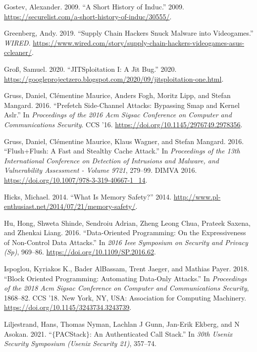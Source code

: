 \documentclass[a4paper,]{report}
\begin{document}
\leavevmode\hypertarget{ref-Gostev2009}{}%
Gostev, Alexander. 2009. ``A Short History of Induc.'' 2009.
\url{https://securelist.com/a-short-history-of-induc/30555/}.

\leavevmode\hypertarget{ref-Greenberg2019}{}%
Greenberg, Andy. 2019. ``Supply Chain Hackers Snuck Malware into
Videogames.'' \emph{WIRED}.
\url{https://www.wired.com/story/supply-chain-hackers-videogames-asus-ccleaner/}.

\leavevmode\hypertarget{ref-Grouxdf2020}{}%
Groß, Samuel. 2020. ``JITSploitation I: A Jit Bug.'' 2020.
\url{https://googleprojectzero.blogspot.com/2020/09/jitsploitation-one.html}.

\leavevmode\hypertarget{ref-Gruss2016}{}%
Gruss, Daniel, Clémentine Maurice, Anders Fogh, Moritz Lipp, and Stefan
Mangard. 2016. ``Prefetch Side-Channel Attacks: Bypassing Smap and
Kernel Aslr.'' In \emph{Proceedings of the 2016 Acm Sigsac Conference on
Computer and Communications Security}. CCS '16.
\url{https://doi.org/10.1145/2976749.2978356}.

\leavevmode\hypertarget{ref-Gruss2016a}{}%
Gruss, Daniel, Clémentine Maurice, Klaus Wagner, and Stefan Mangard.
2016. ``Flush+Flush: A Fast and Stealthy Cache Attack.'' In
\emph{Proceedings of the 13th International Conference on Detection of
Intrusions and Malware, and Vulnerability Assessment - Volume 9721},
279--99. DIMVA 2016. \url{https://doi.org/10.1007/978-3-319-40667-1_14}.

\leavevmode\hypertarget{ref-Hicks2014}{}%
Hicks, Michael. 2014. ``What Is Memory Safety?'' 2014.
\url{http://www.pl-enthusiast.net/2014/07/21/memory-safety/}.

\leavevmode\hypertarget{ref-Hu2016}{}%
Hu, Hong, Shweta Shinde, Sendroiu Adrian, Zheng Leong Chua, Prateek
Saxena, and Zhenkai Liang. 2016. ``Data-Oriented Programming: On the
Expressiveness of Non-Control Data Attacks.'' In \emph{2016 Ieee
Symposium on Security and Privacy (Sp)}, 969--86.
\url{https://doi.org/10.1109/SP.2016.62}.

\leavevmode\hypertarget{ref-Ispoglou2018}{}%
Ispoglou, Kyriakos K., Bader AlBassam, Trent Jaeger, and Mathias Payer.
2018. ``Block Oriented Programming: Automating Data-Only Attacks.'' In
\emph{Proceedings of the 2018 Acm Sigsac Conference on Computer and
Communications Security}, 1868--82. CCS '18. New York, NY, USA:
Association for Computing Machinery.
\url{https://doi.org/10.1145/3243734.3243739}.

\leavevmode\hypertarget{ref-Liljestrand2021}{}%
Liljestrand, Hans, Thomas Nyman, Lachlan J Gunn, Jan-Erik Ekberg, and N
Asokan. 2021. ``\(\{\)PACStack\(\}\): An Authenticated Call Stack.'' In
\emph{30th Usenix Security Symposium (Usenix Security 21)}, 357--74.
\end{document}
